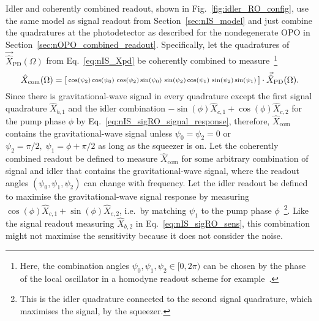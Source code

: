 Idler and coherently combined readout, shown in Fig.~\ref{fig:idler_RO_config}, use the same model as signal readout from Section~\ref{sec:nIS_model} and just combine the quadratures at the photodetector as described for the nondegenerate OPO in Section~\ref{sec:nOPO_combined_readout}. Specifically, let the quadratures of $\vec{\hat X}_\text{PD}(\Omega)$ from Eq.~\ref{eq:nIS_Xpd} be coherently combined to measure~\footnote{Here, the combination angles $\psi_0,\psi_1,\psi_2\in[0,2\pi)$ can be chosen by the phase of the local oscillator in a homodyne readout scheme for example~\cite{}.}
\begin{equation}\label{eq:Xcom_three_angles}
\hat X_\text{com}(\Omega)=\begin{bsmallmatrix}\cos(\psi_2)\cos(\psi_0) & \cos(\psi_2)\sin(\psi_0) & \sin(\psi_2)\cos(\psi_1) & \sin(\psi_2)\sin(\psi_1)\end{bsmallmatrix}\cdot\vec{\hat X}_\text{PD}(\Omega).
\end{equation}
Since there is gravitational-wave signal in every quadrature except the first signal quadrature $\hat{X}_{b,1}$ and the idler combination $-\sin(\phi)\hat{X}_{c,1}+\cos(\phi)\hat{X}_{c,2}$ for the pump phase $\phi$ by Eq.~\ref{eq:nIS_sigRO_signal_response}, therefore, $\hat{X}_\text{com}$ contains the gravitational-wave signal unless $\psi_0=\psi_2=0$ or $\psi_2=\pi/2,\;\psi_1=\phi+\pi/2$ as long as the squeezer is on. 
Let the coherently combined readout be defined to measure $\hat{X}_\text{com}$ for some arbitrary combination of signal and idler that contains the gravitational-wave signal, where the readout angles $(\psi_0,\psi_1,\psi_2)$ can change with frequency.
Let the idler readout be defined to maximise the gravitational-wave signal response by measuring $\cos(\phi)\hat{X}_{c,1}+\sin(\phi)\hat{X}_{c,2}$, i.e.\ by matching $\psi_1$ to the pump phase $\phi$~\footnote{This is the idler quadrature connected to the second signal quadrature, which maximises the signal, by the squeezer.}. Like the signal readout measuring $\hat{X}_{b,2}$ in Eq.~\ref{eq:nIS_sigRO_sens}, this combination might not maximise the sensitivity because it does not consider the noise. %
